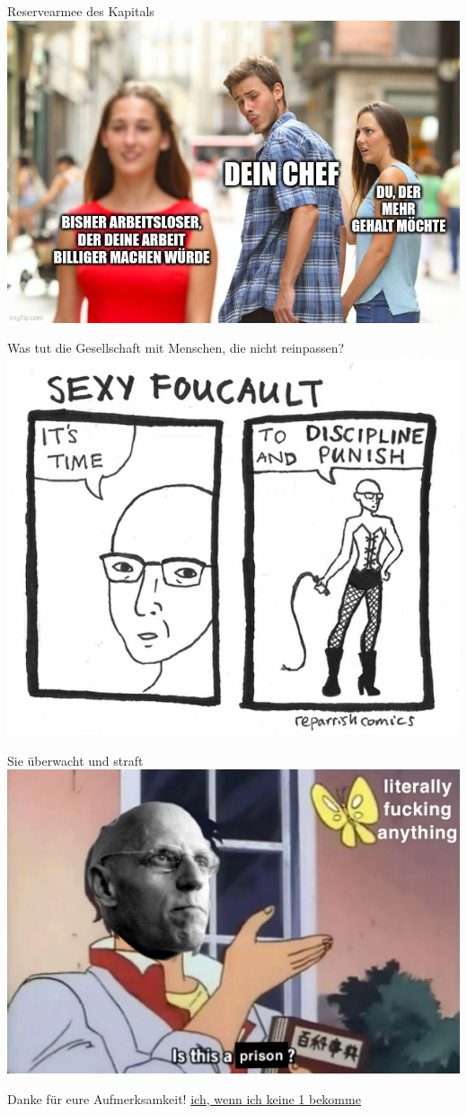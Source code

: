 \documentclass{beamer}
\begin{document}
\begin{frame}{Reservearmee des Kapitals}
\includegraphics[width=\linewidth]{stummer-zwang.jpg}
\end{frame}
\begin{frame}{Was tut die Gesellschaft mit Menschen, die nicht reinpassen?}
    \includegraphics[width=\textwidth]{sexy_foucault.png}
\end{frame}
\begin{frame}{Sie überwacht und straft}
    \includegraphics[width=\textwidth]{is_this_prison.jpeg}
\end{frame}
\begin{frame}{Danke für eure Aufmerksamkeit!}
 \href{https://www.youtube.com/watch?v=l8ukak8P2vY}{ich, wenn ich keine 1 bekomme}
\end{frame}
\end{document}
